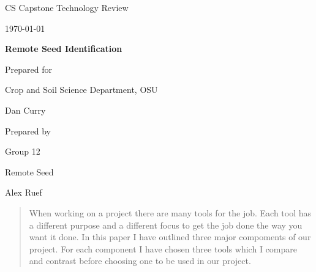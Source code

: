 \documentclass[onecolumn, draftclsnofoot,10pt, compsoc]{IEEEtran}
\def \CapstoneTeamName{		Remote Seed}
\def \CapstoneTeamNumber{		12}
\def \GroupMemberOne{			Quanah Green}
\def \GroupMemberTwo{			Alex Ruef}
\def \GroupMemberThree{			Ethan Takla}
\def \CapstoneProjectName{		Remote Seed Identification}
\def \CapstoneSponsorCompany{	Crop and Soil Science Department, OSU}
\def \CapstoneSponsorPerson{		Dan Curry}
\def \DocType{		%
				Technology Review
				}
\newcommand{\NameSigPair}[1]{\par
\makebox[2.75in][r]{#1} \hfil 	\makebox[3.25in]{\makebox[2.25in]{\hrulefill} \hfill		\makebox[.75in]{\hrulefill}}
\par\vspace{-12pt} \textit{\tiny\noindent
\makebox[2.75in]{} \hfil		\makebox[3.25in]{\makebox[2.25in][r]{Signature} \hfill	\makebox[.75in][r]{Date}}}}
\renewcommand{\NameSigPair}[1]{#1}
\begin{document}
\begin{titlepage}
    \begin{singlespace}
        \hfill 
        \par\vspace{.2in}
        \centering
        \scshape{
            \huge CS Capstone \DocType \par
            {\large\today}\par
            \vspace{.5in}
            \textbf{\Huge\CapstoneProjectName}\par
            \vfill
            {\large Prepared for}\par
            \Huge \CapstoneSponsorCompany\par
            \vspace{5pt}
            {\Large\NameSigPair{\CapstoneSponsorPerson}\par}
            {\large Prepared by }\par
            Group\CapstoneTeamNumber\par
            \CapstoneTeamName\par 
            \vspace{5pt}
            {\Large
                \NameSigPair{\GroupMemberTwo}\par
            }
            \vspace{20pt}
        }
        \begin{abstract}
        		When working on a project there are many tools for the job.
		Each tool has a different purpose and a different focus to get the job done the way you want it done.
		In this paper I have outlined three major compoments of our project.
		For each component I have chosen three tools which I compare and contrast before choosing one to be used in our project.

        \end{abstract}     
    \end{singlespace}
\end{titlepage}
\newpage
{}
\tableofcontents
\clearpage
\end{document}
